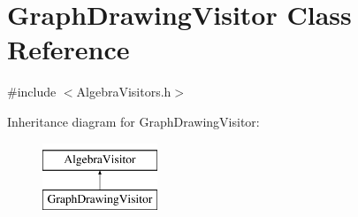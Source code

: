 \hypertarget{class_graph_drawing_visitor}{\section{Graph\+Drawing\+Visitor Class Reference}
\label{class_graph_drawing_visitor}
}


{\ttfamily \#include $<$Algebra\+Visitors.\+h$>$}

Inheritance diagram for Graph\+Drawing\+Visitor\+:\begin{figure}[H]
\begin{center}
\leavevmode
\includegraphics[height=2.000000cm]{class_graph_drawing_visitor}
\end{center}
\end{figure}
